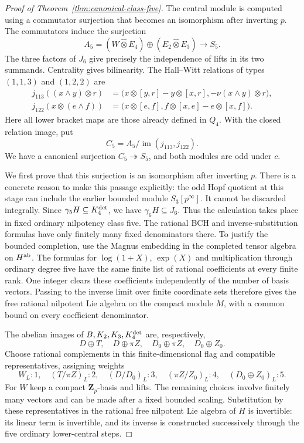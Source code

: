 \documentclass[11pt]{article}
\theoremstyle{definition}\newtheorem{definition}[theorem]{Definition}
\begin{document}
\begin{proof}[Proof of Theorem~\ref{thm:canonical-class-five}]
The central module is computed using a commutator
surjection that becomes an isomorphism after inverting $p$.
The commutators induce the surjection
\[
 A_5=(W\widehat\otimes E_4)\oplus
                              (E_2\widehat\otimes E_3)
                         \longrightarrow S_5.
\]
The three factors of $J_6$ give precisely the
independence of lifts in its two summands.
Centrality gives bilinearity. The Hall--Witt relations
of types $(1,1,3)$ and $(1,2,2)$ are
\begin{align*}
 j_{113}((x\wedge y)\otimes r)
   &=\bigl(x\otimes[y,r]-y\otimes[x,r],
                                  -\nu(x\wedge y)\otimes r\bigr),\\
 j_{122}(x\otimes(e\wedge f))
   &=\bigl(x\otimes[e,f],
                                  f\otimes[x,e]-e\otimes[x,f]\bigr).
\end{align*}
Here all lower bracket maps are those already defined
in $Q_4$. With the closed relation image, put
\begin{equation}\label{eq:class5-candidate}
 C_5=A_5/\operatorname{im}(j_{113},j_{122}).
\end{equation}
We have a canonical surjection $C_5\twoheadrightarrow S_5$,
and both modules are odd under $c$.

We first prove that this surjection is an isomorphism
after inverting $p$. There is a concrete reason to
make this passage explicitly: the odd Hopf quotient
at this stage can include the earlier bounded module
$S_3[p^\infty]$. It cannot be discarded integrally.
Since $\gamma_5H\subseteq K_4^{\rm det}$, we have
$\gamma_6H\subseteq J_6$. Thus the calculation takes
place in fixed ordinary nilpotency class five.
The rational BCH and inverse-substitution formulas
have only finitely many fixed denominators there.
To justify the bounded completion, use the Magnus
embedding in the completed tensor algebra on
$H^{\rm ab}$. The formulas for $\log(1+X)$, $\exp(X)$
and multiplication through ordinary degree five have
the same finite list of rational coefficients at
every finite rank. One integer clears these
coefficients independently of the number of basis
vectors. Passing to the inverse limit over finite
coordinate sets therefore gives the free rational
nilpotent Lie algebra on the compact module $M$,
with a common bound on every coefficient denominator.

The abelian images of $B,K_2,K_3,K_4^{\rm det}$
are, respectively,
\[
 D\oplus T,\quad D\oplus\pi Z,\quad
 D_0\oplus\pi Z,\quad D_0\oplus Z_0.
\]
Choose rational complements in this finite-dimensional
flag and compatible representatives, assigning weights
\[
 W_L:1,\quad (T/\pi Z)_L:2,\quad (D/D_0)_L:3,
 \quad(\pi Z/Z_0)_L:4,\quad(D_0\oplus Z_0)_L:5.
\]
For $W$ keep a compact $\mathbf Z_p$-basis and lifts.
The remaining choices involve finitely many vectors
and can be made after a fixed bounded scaling.
Substitution by these representatives in the rational
free nilpotent Lie algebra of $H$ is invertible:
its linear term is invertible, and its inverse is
constructed successively through the five ordinary
lower-central steps.


\end{proof}
\end{document}
